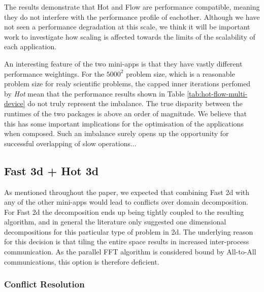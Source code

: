 \documentclass[runningheads,a4paper]{llncs}
\begin{document}
%


The results demonstrate that Hot and Flow are performance compatible, meaning they do not interfere with the performance profile of eachother. Although we have not seen a performance degradation at this scale, we think it will be important work to investigate how scaling is affected towards the limits of the scalability of each application.

An interesting feature of the two mini-apps is that they have vastly different performance weightings. For the $5000^2$ problem size, which is a reasonable problem size for realy scientific problems, the capped inner iterations perfomed by \textit{Hot} mean that the performance results shown in Table \ref{tab:hot-flow-multi-device} do not truly represent the imbalance. The true disparity between the runtimes of the two packages is above an order of magnitude. We believe that this has some important implications for the optimisation of the applications when composed. Such an imbalance surely opens up the opportunity for successful overlapping of slow operations...

\subsection{Fast 3d + Hot 3d}

As mentioned throughout the paper, we expected that combining Fast 2d with any of the other mini-apps would lead to conflicts over domain decomposition. For Fast 2d the decomposition ends up being tightly coupled to the resulting algorithm, and in general the literature only suggested one dimensional decompositions for this particular type of problem in 2d. The underlying reason for this decision is that tiling the entire space results in increased inter-process communication. As the parallel FFT algorithm is considered bound by All-to-All communications, this option is therefore deficient.

\subsubsection{Conflict Resolution}
\end{document}
